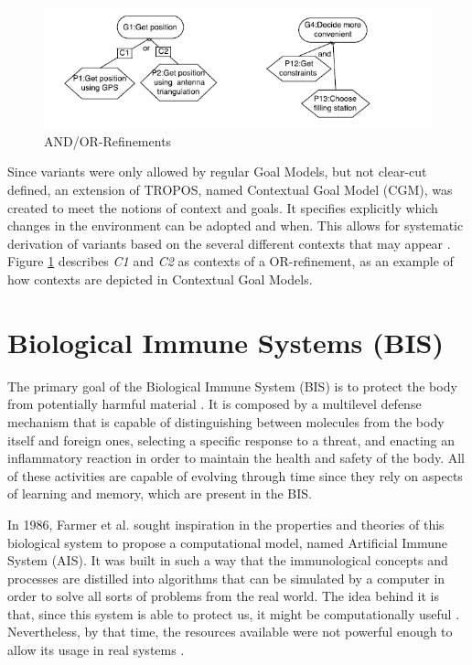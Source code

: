 \begin{figure}[!htb]
 \centering
 \includegraphics[width=\linewidth]{img/and-or-fill.png}
 \caption{AND/OR-Refinements}
\label{fig:andorref}
\end{figure}  


Since variants were only allowed by regular Goal Models, but not clear-cut defined, an extension of TROPOS, named Contextual Goal Model (CGM), was created to meet the notions of context and goals. It specifies explicitly which changes in the environment can be adopted and when. This allows for systematic derivation of variants based on the  several different contexts that may appear \cite{ali_goal_based_2010}. Figure \ref{fig:andorref} describes \textit{C1} and \textit{C2} as contexts of a OR-refinement, as an example of how contexts are depicted in Contextual Goal Models.



\section{Biological Immune Systems (BIS)} \label{sec:bgais}

The primary goal of the Biological Immune System (BIS) is to protect the body from potentially harmful material \cite{AISSOA2015}. It is composed by a multilevel defense mechanism that is capable of distinguishing between molecules from the body itself and foreign ones, selecting a specific response to a threat, and enacting an inflammatory reaction in order to maintain the health and safety of the body. All of these activities are capable of evolving through time since they rely on aspects of learning and memory, which are present in the BIS.

In 1986, Farmer et al. \cite{ImmuneSysAdapML1986} sought inspiration in the properties and theories of this biological system to propose a computational model, named Artificial Immune System (AIS). It was built in such a way that the immunological concepts and processes are distilled into algorithms that can be simulated by a computer in order to solve all sorts of problems from the real world. The idea behind it is that, since this system is able to protect us, it might be computationally useful \cite{EvaluateAIS2005}. Nevertheless, by that time, the resources available were not powerful enough to allow its usage in real systems \cite{AdaptiveImmunitySAS2021}.

